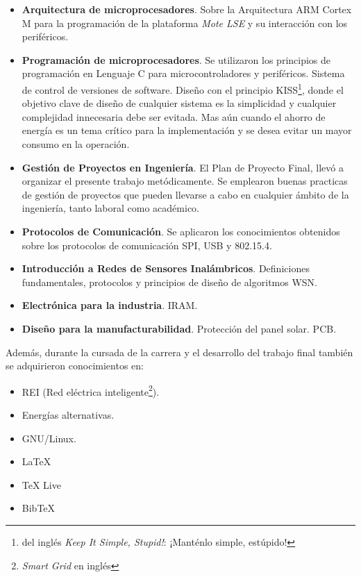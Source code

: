 \begin{itemize}
\item
\textbf{Arquitectura de microprocesadores}. Sobre la Arquitectura ARM Cortex M para la programación de la plataforma \textit{Mote LSE} y su interacción con los periféricos.

\item
\textbf{Programación de microprocesadores}. Se utilizaron los principios de programación en Lenguaje C para microcontroladores y periféricos. Sistema de control de versiones de software. Diseño con el principio KISS\footnote{del inglés \textit{Keep It Simple, Stupid!}: ¡Manténlo simple, estúpido!}, donde el objetivo clave de diseño de cualquier sistema es la simplicidad y cualquier complejidad innecesaria debe ser evitada. Mas aún cuando el ahorro de energía es un tema crítico para la implementación y se desea evitar un mayor consumo en la operación. 

\item
\textbf{Gestión de Proyectos en Ingeniería}. El Plan de Proyecto Final, llevó a organizar el presente trabajo metódicamente. Se emplearon buenas practicas de gestión de proyectos que pueden llevarse a cabo en cualquier ámbito de la ingeniería, tanto laboral como académico.

\item 
\textbf{Protocolos de Comunicación}. Se aplicaron los conocimientos obtenidos sobre los protocolos de comunicación SPI, USB y 802.15.4.

\item 
\textbf{Introducción a Redes de Sensores Inalámbricos}. Definiciones fundamentales, protocolos y principios de diseño de algoritmos WSN.

\item 
\textbf{Electrónica para la industria}. IRAM.

\item 
\textbf{Diseño para la manufacturabilidad}. Protección del panel solar. PCB.
\end{itemize}
\medskip

\noindent Además, durante la cursada de la carrera y el desarrollo del trabajo final también se adquirieron conocimientos en:

\begin{itemize}
	\item REI (Red eléctrica inteligente\footnote{\textit{Smart Grid} en inglés}).
	\item Energías alternativas.	
	\item GNU/Linux.
	\item \LaTeX \citep{LaTeX}
	\item TeX Live \citep{TeX Live}
	\item BibTeX \citep{BibTeX}
	
\end{itemize}

